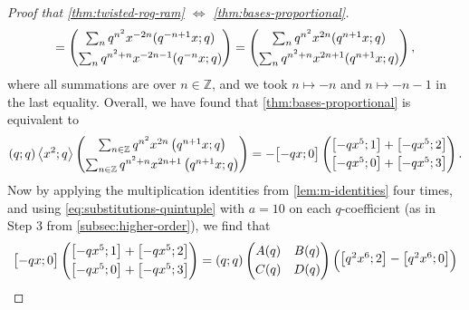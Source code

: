 \documentclass[reqno,11pt]{amsart}
\theoremstyle{definition}
\theoremstyle{remark}
\numberwithin{equation}{section}
\newcommand{\Z}{\mathbb{Z}}
\newcommand{\la}{\left\langle}
\newcommand{\ra}{\right\rangle}
\newcommand{\vect}[2]{\big[{#1};{#2}\big]}
\begin{document}
\begin{proof}[Proof that \cref{thm:twisted-rog-ram} $\Leftrightarrow$ \cref{thm:bases-proportional}]
\[    =
    \begin{pmatrix}
    \sum_{n}
    q^{n^2} x^{-2n} (q^{-n+1}x; q)
    \vspace{0.1cm} \\
    \sum_{n}
    q^{n^2+n} x^{-2n-1} (q^{-n}x; q)
    \end{pmatrix}
    =
    \begin{pmatrix}
    \sum_{n}
    q^{n^2} x^{2n} (q^{n+1}x; q)
    \vspace{0.1cm} \\
    \sum_{n}
    q^{n^2+n} x^{2n+1} (q^{n+1}x; q)
    \end{pmatrix},
\]
where all summations are over $n \in \Z$, and we took $n \mapsto -n$ and $n \mapsto -n-1$ in the last equality. Overall, we have found that \cref{thm:bases-proportional} is equivalent to
\begin{equation} \label{eq:first-thm-reformulation}
    (q; q) \la x^2; q \ra \begin{pmatrix}
    \sum_{n \in \Z} q^{n^2} x^{2n}  \left( q^{n+1}x; q\right) \vspace{0.1cm} \\ 
    \sum_{n \in \Z} q^{n^2 + n}x^{2n+1}  \left( q^{n+1}x; q\right)
    \end{pmatrix}
    = 
    -\vect{-qx}{0}
    \begin{pmatrix}
    \vect{-qx^5}{1} + \vect{-qx^5}{2} 
    \vspace{0.1cm} \\
    \vect{-qx^5}{0} + \vect{-qx^5}{3} 
    \end{pmatrix}.
\end{equation}
Now by applying the multiplication identities from \cref{lem:m-identities} four times, and using \cref{eq:substitutions-quintuple} with $a = 10$ on each $q$-coefficient (as in Step 3 from \cref{subsec:higher-order}), we find that
\[
    \vect{-qx}{0}
    \begin{pmatrix}
    \vect{-qx^5}{1} + \vect{-qx^5}{2} 
    \vspace{0.1cm} \\
    \vect{-qx^5}{0} + \vect{-qx^5}{3} 
    \end{pmatrix}
    =
    (q; q)
    \begin{pmatrix}
    A(q) & B(q) \vspace{0.1cm}\\
    C(q) & D(q)
    \end{pmatrix}
    \begin{pmatrix}
    \vect{q^2x^6}{2} - \vect{q^2x^6}{0}
    \vspace{0.1cm} \\

\end{pmatrix}\]
\end{proof}
\end{document}
